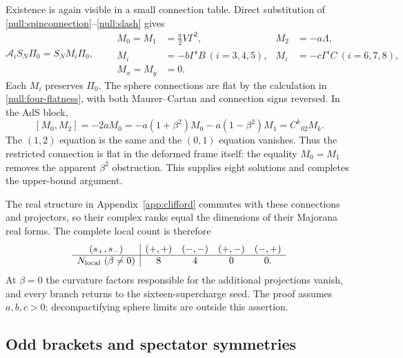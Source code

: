Existence is again visible in a small connection table. Direct substitution of \eqref{null:spinconnection}--\eqref{null:slash} gives
\begin{equation}\label{null:eight-connection}
 \mathcal A_iS_N\Pi_0=S_N M_i\Pi_0,\qquad
 \begin{aligned}
 M_0=M_1&=\frac a2V\Gamma^2,& M_2&=-a\Lambda,\\
 M_i&=-b\Gamma^iB\ (i=3,4,5),&
 M_i&=-c\Gamma^iC\ (i=6,7,8),\\
 M_x=M_y&=0.
 \end{aligned}
\end{equation}
Each $M_i$ preserves $\Pi_0$. The sphere connections are flat by the calculation in \eqref{null:four-flatness}, with both Maurer--Cartan and connection signs reversed. In the AdS block,
\begin{equation}\label{null:eight-flatness}
 [M_0,M_2]=-2aM_0
 =-a(1+\beta^2)M_0-a(1-\beta^2)M_1
 =C^k{}_{02}M_k.
\end{equation}
The $(1,2)$ equation is the same and the $(0,1)$ equation vanishes. Thus the restricted connection is flat in the deformed frame itself: the equality $M_0=M_1$ removes the apparent $\beta^2$ obstruction. This supplies eight solutions and completes the upper-bound argument.

The real structure in Appendix~\ref{app:clifford} commutes with these connections and projectors, so their complex ranks equal the dimensions of their Majorana real forms. The complete local count is therefore
\begin{equation}\label{null:count}
\begin{array}{c|cccc}
 (s_+,s_-)&(+,+)&(-,-)&(+,-)&(-,+)\\\hline
 N_{\rm local}\ (\beta\ne0)&8&4&0&0.
\end{array}
\end{equation}
At $\beta=0$ the curvature factors responsible for the additional projections vanish, and every branch returns to the sixteen-supercharge seed. The proof assumes $a,b,c>0$; decompactifying sphere limits are outside this assertion.

\subsection{Odd brackets and spectator symmetries}

